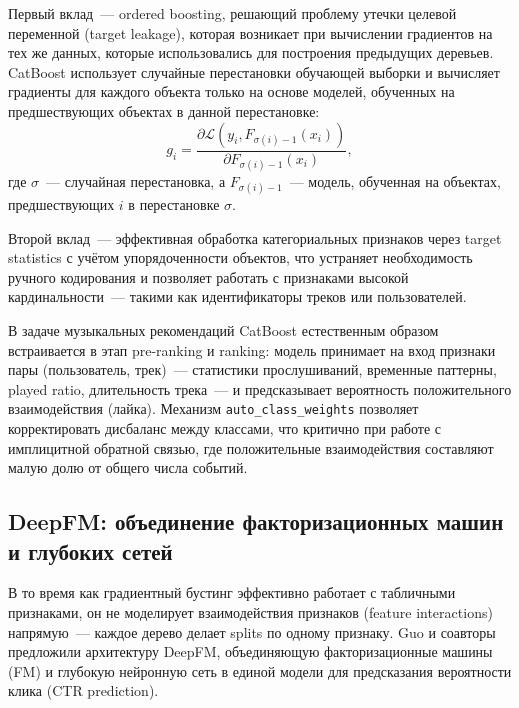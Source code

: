 Первый вклад~--- ordered boosting, решающий проблему утечки целевой переменной (target leakage), которая возникает при вычислении градиентов на тех же данных, которые использовались для построения предыдущих деревьев. CatBoost использует случайные перестановки обучающей выборки и вычисляет градиенты для каждого объекта только на основе моделей, обученных на предшествующих объектах в данной перестановке:
\begin{equation}
    g_i = \frac{\partial \mathcal{L}(y_i, F_{\sigma(i)-1}(x_i))}{\partial F_{\sigma(i)-1}(x_i)},
\end{equation}
где $\sigma$~--- случайная перестановка, а $F_{\sigma(i)-1}$~--- модель, обученная на объектах, предшествующих $i$ в перестановке $\sigma$.

Второй вклад~--- эффективная обработка категориальных признаков через target statistics с учётом упорядоченности объектов, что устраняет необходимость ручного кодирования и позволяет работать с признаками высокой кардинальности~--- такими как идентификаторы треков или пользователей.

В задаче музыкальных рекомендаций CatBoost естественным образом встраивается в этап pre-ranking и ranking: модель принимает на вход признаки пары (пользователь, трек)~--- статистики прослушиваний, временные паттерны, played ratio, длительность трека~--- и предсказывает вероятность положительного взаимодействия (лайка). Механизм \texttt{auto\_class\_weights} позволяет корректировать дисбаланс между классами, что критично при работе с имплицитной обратной связью, где положительные взаимодействия составляют малую долю от общего числа событий.

\subsection{DeepFM: объединение факторизационных машин и глубоких сетей}

В то время как градиентный бустинг эффективно работает с табличными признаками, он не моделирует взаимодействия признаков (feature interactions) напрямую~--- каждое дерево делает splits по одному признаку. Guo и соавторы~\cite{guo2017deepfm} предложили архитектуру DeepFM, объединяющую факторизационные машины (FM) и глубокую нейронную сеть в единой модели для предсказания вероятности клика (CTR prediction).

